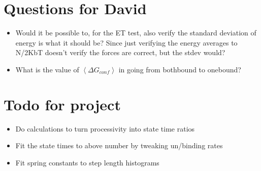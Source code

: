 \documentclass[10pt]{article} %
\begin{document}
\section{Questions for David}
\begin{itemize}
\item Would it be possible to, for the ET test, also verify the standard deviation of energy is what it should be? Since just verifying the energy averages to N/2KbT doesn't verify the forces are correct, but the stdev would?
\item What is the value of $\left<\Delta G_{conf}\right>$ in going from bothbound to onebound?
\end{itemize}

\section{Todo for project}
\begin{itemize}
\item Do calculations to turn processivity into state time ratios
\item Fit the state times to above number by tweaking un/binding rates
\item Fit spring constants to step length histograms
\end{itemize}
\end{document}
